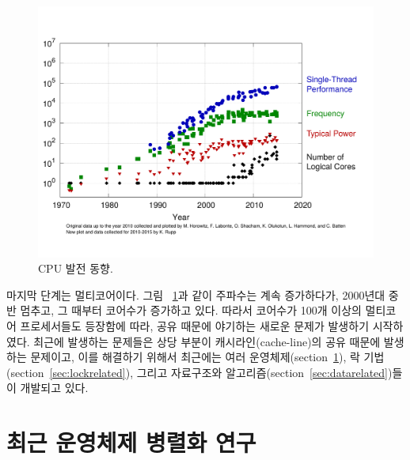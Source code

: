\begin{figure}[h]
  \begin{center}
    \includegraphics[scale=0.3]{fig/cpu}
  \end{center}
  \caption{CPU 발전 동향.}
  \label{fig:aim7}
\end{figure}

마지막 단계는 멀티코어이다.
그림 ~\ref{fig:aim7}과 같이 주파수는 계속 증가하다가, 2000년대 중반 멈추고, 그
때부터 코어수가 증가하고 있다. 
따라서 코어수가 100개 이상의 멀티코어 프로세서들도 등장함에 따라, 공유 때문에 야기하는 
새로운 문제가 발생하기 시작하였다. 
최근에 발생하는 문제들은 상당 부분이 캐시라인(cache-line)의 공유 때문에 발생하는 문제이고, 
이를 해결하기 위해서 최근에는 여러 운영체제(section~\ref{sec:osrelated}),
 락 기법(section~\ref{sec:lockrelated}), 그리고 자료구조와
 알고리즘(section~\ref{sec:datarelated})들이 개발되고 있다.


\newpage
\section{최근 운영체제 병렬화 연구}
\label{sec:osrelated}

%
 
